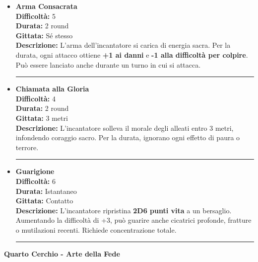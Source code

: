 \documentclass[../manuale_main.tex]{subfiles}
\begin{document}
\begin{itemize}

\item \textbf{Arma Consacrata} \\
\textbf{Difficoltà:} 5 \\
\textbf{Durata:} 2 round \\
\textbf{Gittata:} Sé stesso \\
\textbf{Descrizione:} L’arma dell’incantatore si carica di energia sacra. Per la durata, ogni attacco ottiene \textbf{+1 ai danni} e \textbf{-1 alla difficoltà per colpire}. Può essere lanciato anche durante un turno in cui si attacca.

\vspace{0.5cm}\rule{\textwidth}{0.4pt}\vspace{1cm}

\item \textbf{Chiamata alla Gloria} \\
\textbf{Difficoltà:} 4 \\
\textbf{Durata:} 2 round \\
\textbf{Gittata:} 3 metri \\
\textbf{Descrizione:} L’incantatore solleva il morale degli alleati entro 3 metri, infondendo coraggio sacro. Per la durata, ignorano ogni effetto di paura o terrore.

\vspace{0.5cm}\rule{\textwidth}{0.4pt}\vspace{1cm}

\item \textbf{Guarigione} \\
\textbf{Difficoltà:} 6 \\
\textbf{Durata:} Istantaneo \\
\textbf{Gittata:} Contatto \\
\textbf{Descrizione:} L’incantatore ripristina \textbf{2D6 punti vita} a un bersaglio. Aumentando la difficoltà di +3, può guarire anche cicatrici profonde, fratture o mutilazioni recenti. Richiede concentrazione totale.

\vspace{0.5cm}\rule{\textwidth}{0.4pt}\vspace{1cm}


\end{itemize}

\clearpage
\vspace{0.2cm}
{\zarafirtitlefont\Large\bfseries Quarto Cerchio - Arte della Fede}
\end{document}
